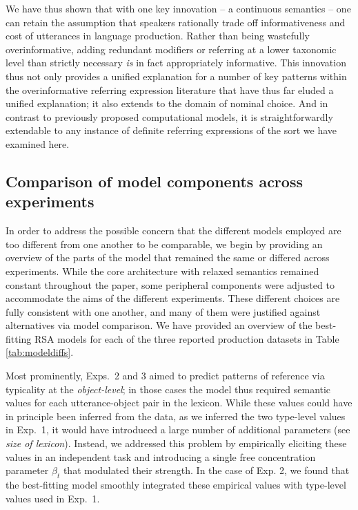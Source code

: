 \documentclass[11pt]{article}
\newcommand{\tableref}[1]{Table \ref{#1}}
\begin{document}
We have thus shown that with one key innovation -- a continuous semantics  -- one can retain the assumption that speakers rationally trade off informativeness and cost of utterances in language production. Rather than being wastefully overinformative, adding redundant modifiers or referring at a lower taxonomic level than strictly necessary \emph{is} in fact appropriately informative.
This innovation thus not only provides a unified explanation for a number of key patterns within the overinformative referring expression literature that have thus far eluded a unified explanation; it also extends to the domain of nominal choice. And in contrast to previously proposed computational models, it is straightforwardly extendable to any instance of definite referring expressions of the sort we have examined here. 

\subsection{Comparison of model components across experiments}

In order to address the possible concern that the different models employed are too different from one another to be comparable, we begin by providing an overview of the parts of the model that remained the same or differed across experiments. While the core architecture with relaxed semantics remained constant throughout the paper, some peripheral components were adjusted to accommodate the aims of the different experiments. 
These different choices are fully consistent with one another, and many of them were justified against alternatives via model comparison.
We have provided an overview of the best-fitting RSA models for each of the three reported production datasets in \tableref{tab:modeldiffs}. 

Most prominently, Exps.~2 and 3 aimed to predict patterns of reference via typicality at the \emph{object-level}; in those cases the model thus required semantic values for each utterance-object pair in the lexicon.
While these values could have in principle been inferred from the data, as we inferred the two type-level values in Exp.~1, it would have introduced a large number of additional parameters (see \emph{size of lexicon}). 
Instead, we addressed this problem by empirically eliciting these values in an independent task and introducing a single free concentration parameter $\beta_t$ that modulated their strength.
In the case of Exp. 2, we found that the best-fitting model smoothly integrated these empirical values with type-level values used in Exp.~1.
\end{document}
